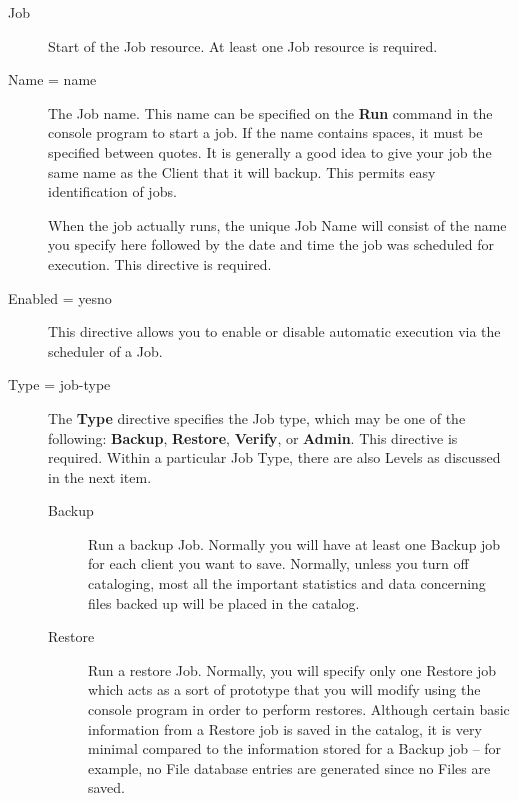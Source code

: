 \begin{description}

\item [Job]
   Start of the Job resource. At least one Job  resource is required. 

\item [Name = \lt{}name\gt{}]
   The Job name. This name can be specified  on the {\bf Run} command in the
   console program to start a job. If the  name contains spaces, it must be
   specified between quotes. It is  generally a good idea to give your job the
   same name as the Client  that it will backup. This permits easy
   identification of jobs.  

   When the job actually runs, the unique Job Name will consist  of the name you
   specify here followed by the date and time the  job was scheduled for
   execution. This directive is required. 

\item [Enabled = \lt{}yes\vb{}no\gt{}]
  This directive allows you to enable or disable automatic execution
  via the scheduler of a Job.

\item [Type = \lt{}job-type\gt{}]
   The {\bf Type} directive specifies  the Job type, which may be one of the
   following: {\bf Backup},  {\bf Restore}, {\bf Verify}, or {\bf Admin}. This
   directive  is required. Within a particular Job Type, there are also Levels 
   as discussed in the next item.  

\begin{description}

\item [Backup]
   Run a backup Job. Normally you will  have at least one Backup job for each
   client you want  to save. Normally, unless you turn off cataloging,  most all
   the important statistics and data concerning  files backed up will be placed
   in the catalog. 

\item [Restore]
   Run a restore Job.  Normally, you will specify only one Restore job
   which acts as a sort of prototype that you will modify using the console
   program in order to perform restores.  Although certain basic
   information from a Restore job is saved in the catalog, it is very
   minimal compared to the information stored for a Backup job -- for
   example, no File database entries are generated since no Files are
   saved.


\end{description}
\end{description}
